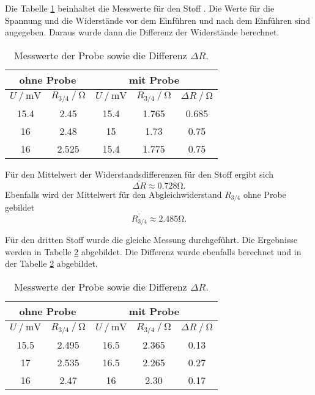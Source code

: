Die Tabelle \ref{tab:gd} beinhaltet die Messwerte für den Stoff . Die Werte für die Spannung und die Widerstände
vor dem Einführen und nach dem Einführen sind angegeben. Daraus wurde dann die Differenz der Widerstände berechnet. 
\begin{table}
  \centering
  \caption{Messwerte der Probe  sowie die Differenz $\Delta R$.}
  \label{tab:gd}
\begin{tabular}{c c | c c | c}
  \hline
  \multicolumn{2}{c}{ohne Probe} & \multicolumn{3}{c}{mit Probe} \\
  \hline
  $U\mathbin{/} \si{\mV}$ & $R_{3/4}\mathbin{/} \si{\ohm}$ & $U\mathbin{/} \si{\mV}$ & $R_{3/4}\mathbin{/} \si{\ohm}$ & $\Delta R\mathbin{/}\si{\ohm}$ \\
  \hline
  15.4 & 2.45 & 15.4  & 1.765 & 0.685\\
  16  & 2.48 & 15  & 1.73 & 0.75\\
  16 & 2.525& 15.4  & 1.775 & 0.75\\
  \bottomrule
  \end{tabular}
\end{table}

Für den Mittelwert der Widerstandsdifferenzen für den Stoff  ergibt sich
\begin{equation*}
  \bar{\Delta R} \approx 0.728 \si{\ohm}.
\end{equation*}
Ebenfalls wird der Mittelwert für den Abgleichwiderstand $R_{3/4}$ ohne Probe gebildet
\begin{equation*}
  \bar{R_{3/4}} \approx 2.485\si{\ohm}.
\end{equation*}

Für den dritten Stoff wurde die gleiche Messung durchgeführt. Die Ergebnisse werden in Tabelle \ref{tab:nd}
abgebildet. Die Differenz wurde ebenfalls berechnet und in der Tabelle \ref{tab:nd} abgebildet.
\begin{table}
  \centering
  \caption{Messwerte der Probe  sowie die Differenz $\Delta R$.}
  \label{tab:nd}
\begin{tabular}{c c | c c | c}
  \hline
  \multicolumn{2}{c}{ohne Probe} & \multicolumn{3}{c}{mit Probe} \\
  \hline
  $U\mathbin{/} \si{\mV}$ & $R_{3/4}\mathbin{/} \si{\ohm}$ & $U\mathbin{/} \si{\mV}$ & $R_{3/4}\mathbin{/} \si{\ohm}$ & $\Delta R\mathbin{/}\si{\ohm}$ \\
  \hline
  15.5 & 2.495 & 16.5  & 2.365 & 0.13\\
  17  & 2.535 & 16.5  & 2.265 & 0.27\\
  16 & 2.47& 16 & 2.30 & 0.17\\
  \bottomrule
  \end{tabular}
\end{table}

